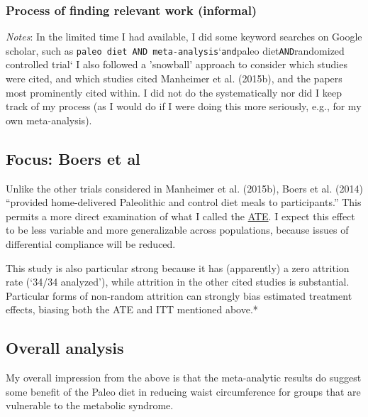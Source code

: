 \documentclass[]{tufte-handout}
\begin{document}
\hypertarget{process-of-finding-relevant-work-informal}{%
\subsubsection{Process of finding relevant work
(informal)}\label{process-of-finding-relevant-work-informal}}

\emph{Notes}: In the limited time I had available, I did some keyword
searches on Google scholar, such as
\texttt{\textquotesingle{}paleo\ diet\textquotesingle{}\ AND\ \textquotesingle{}meta-analysis}`\texttt{and}paleo
diet\texttt{AND}randomized controlled trial` I also followed a
'snowball' approach to consider which studies were cited, and which
studies cited Manheimer et al. (2015b), and the papers most prominently
cited within. I did not do the systematically nor did I keep track of my
process (as I would do if I were doing this more seriously, e.g., for my
own meta-analysis).

\hypertarget{boers}{%
\subsection{Focus: Boers et al}\label{boers}}

Unlike the other trials considered in Manheimer et al. (2015b), Boers et
al. (2014) ``provided home-delivered Paleolithic and control diet meals
to participants.'' This permits a more direct examination of what I
called the \protect\hyperlink{compliance}{ATE}. I expect this effect to
be less variable and more generalizable across populations, because
issues of differential compliance will be reduced.

This study is also particular strong because it has (apparently) a zero
attrition rate (`34/34 analyzed'), while attrition in the other cited
studies is substantial. Particular forms of non-random attrition can
strongly bias estimated treatment effects, biasing both the ATE and ITT
mentioned above.*


\hypertarget{overall-analysis}{%
\subsection{Overall analysis}\label{overall-analysis}}

My overall impression from the above is that the meta-analytic results
do suggest some benefit of the Paleo diet in reducing waist
circumference for groups that are vulnerable to the metabolic syndrome.
\end{document}
